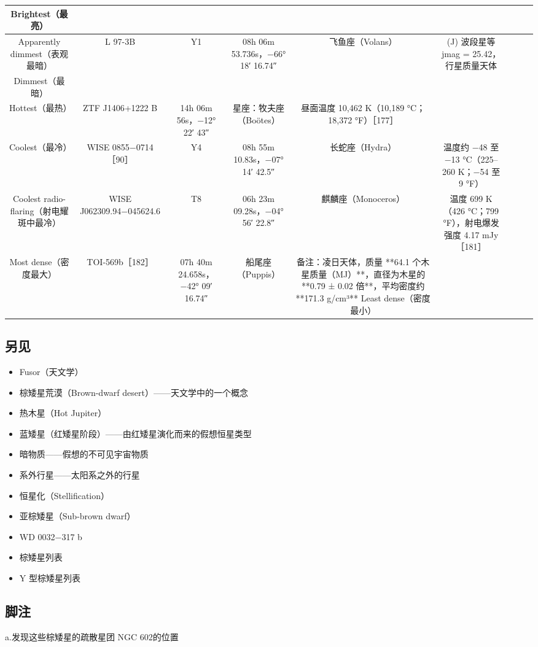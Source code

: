 \begin{table}[ht]
\begin{tabular}{|c|c|c|c|c|c|}
\hline
Brightest（最亮） &   &   &   &   & \\
\hline
Apparently dimmest（表观最暗） & L 97-3B  & Y1  & 08h 06m 53.736s，−66° 18′ 16.74″ & 飞鱼座（Volans） & (J) 波段星等 jmag = 25.42，行星质量天体\\
\hline
Dimmest（最暗） &   &   &   &   & \\
\hline
Hottest（最热） & ZTF J1406+1222 B  & 14h 06m 56s，−12° 22′ 43″  & 星座：牧夫座（Boötes） & 昼面温度 10,462 K（10,189 °C；18,372 °F）［177］\\
\hline
Coolest（最冷）& WISE 0855−0714［90］ & Y4  & 08h 55m 10.83s，−07° 14′ 42.5″  & 长蛇座（Hydra） & 温度约 −48 至 −13 °C（225–260 K；−54 至 9 °F）\\
\hline
Coolest radio-flaring（射电耀斑中最冷） & WISE J062309.94−045624.6  & T8  & 06h 23m 09.28s，−04° 56′ 22.8″ & 麒麟座（Monoceros） & 
温度 699 K（426 °C；799 °F），射电爆发强度 4.17 mJy［181］\\
\hline
Most dense（密度最大） & TOI-569b［182］ & 07h 40m 24.658s，−42° 09′ 16.74″  & 船尾座（Puppis） & 
备注：凌日天体，质量 **64.1 个木星质量（MJ）**，直径为木星的 **0.79 ± 0.02 倍**，平均密度约 **171.3 g/cm³**
\hline
Least dense（密度最小） &   &   &   &   & \\
\hline
\end{tabular}
\end{table}
\subsection{另见}
\begin{itemize}
\item Fusor（天文学）
\item 棕矮星荒漠（Brown-dwarf desert）——天文学中的一个概念
\item 热木星（Hot Jupiter）
\item 蓝矮星（红矮星阶段）——由红矮星演化而来的假想恒星类型
\item 暗物质——假想的不可见宇宙物质
\item 系外行星——太阳系之外的行星
\item 恒星化（Stellification）
\item 亚棕矮星（Sub-brown dwarf）
\item WD 0032−317 b
\item 棕矮星列表
\item Y 型棕矮星列表
\end{itemize}
\subsection{脚注}
a.发现这些棕矮星的疏散星团 NGC 602的位置
